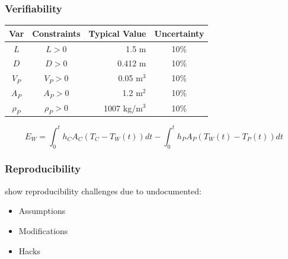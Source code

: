 \documentclass{beamer}
\begin{document}
\begin{frame}

\frametitle{Verifiability}

\begin{table} 
\centering
\begin{tabular}{c c r c } 
\toprule
\textbf{Var} & \textbf{Constraints} & \textbf{Typical Value} & \textbf{Uncertainty}\\ \midrule
$L$ & $L > 0$ & 1.5 m & 10\% \\ 
$D$ & $D > 0$ & 0.412 m & 10\% \\ 
$V_P$ & $V_P > 0$ & 0.05 m$^3$	& 10\% \\
$A_P$ & $A_P > 0$ & 1.2 m$^2$	& 10\% \\
$\rho_P$ & $\rho_P > 0$	& 1007 kg/m$^3$	& 10\% \\
\bottomrule
\end{tabular}
\label{tab:pcm}
\end{table}

\begin{equation*}
E_W = \int_{0}^{t} h_C A_C (T_C - T_W(t)) dt - \int_{0}^{t} h_P A_P (T_W(t) - T_P(t)) dt
\end{equation*}

\end{frame}


\begin{frame}

\frametitle{Reproducibility}

\cite{IonescuAndJansson2013} show reproducibility challenges due to
undocumented:
\begin{itemize}
\item Assumptions
\item Modifications
\item Hacks
\end{itemize}

\end{frame}
\end{document}
